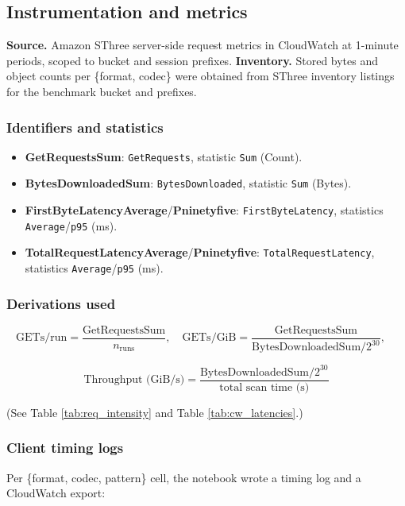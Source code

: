 \documentclass[nomenclature, english, bibtex]{kththesis}
\numberwithin{listing}{chapter}
\begin{document}
\subsection{Instrumentation and metrics}
\label{app:a4-metrics}
\textbf{Source.} Amazon \gls{SThree} server-side request metrics in CloudWatch at 1-minute periods, scoped to bucket and session prefixes. \textbf{Inventory.} Stored bytes and object counts per \{format, codec\} were obtained from \gls{SThree} inventory listings for the benchmark bucket and prefixes.

\subsubsection*{Identifiers and statistics}
\begin{itemize}
  \item \textbf{GetRequestsSum}: \texttt{GetRequests}, statistic \texttt{Sum} (Count).
  \item \textbf{BytesDownloadedSum}: \texttt{BytesDownloaded}, statistic \texttt{Sum} (Bytes).
  \item \textbf{FirstByteLatencyAverage}/\textbf{\gls{Pninetyfive}}: \texttt{FirstByteLatency}, statistics \texttt{Average}/\texttt{p95} (ms).
  \item \textbf{TotalRequestLatencyAverage}/\textbf{\gls{Pninetyfive}}: \texttt{TotalRequestLatency}, statistics \texttt{Average}/\texttt{p95} (ms).
\end{itemize}

\subsubsection*{Derivations used}
\[
\text{GETs/run}=\frac{\text{GetRequestsSum}}{n_{\text{runs}}},\quad
\text{GETs/GiB}=\frac{\text{GetRequestsSum}}{\text{BytesDownloadedSum}/2^{30}},\quad
\]

\[
\text{Throughput (GiB/s)}=\frac{\text{BytesDownloadedSum}/2^{30}}{\text{total scan time (s)}}
\]

(See Table \ref{tab:req_intensity} and Table \ref{tab:cw_latencies}.)

\subsubsection*{Client timing logs}
Per \{format, codec, pattern\} cell, the notebook wrote a timing log and a CloudWatch export:
\end{document}
